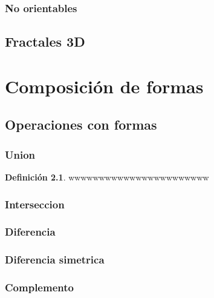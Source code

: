 \documentclass[
  16pt,
]{krantz}
\theoremstyle{definition}
\newtheorem{definition}{Definición}[chapter]
\theoremstyle{definition}
\theoremstyle{definition}
\theoremstyle{definition}
\theoremstyle{remark}
\begin{document}
\hypertarget{no-orientables}{%
\subsection{No orientables}\label{no-orientables}}

\hypertarget{fractales-3d}{%
\section{Fractales 3D}\label{fractales-3d}}

\hypertarget{composiciuxf3n-de-formas}{%
\chapter{Composición de formas}\label{composiciuxf3n-de-formas}}

\hypertarget{operaciones-con-formas}{%
\section{Operaciones con formas}\label{operaciones-con-formas}}

\hypertarget{union}{%
\subsection{Union}\label{union}}

\begin{definition}
\protect\hypertarget{def:unnamed-chunk-1}{}{\label{def:unnamed-chunk-1} }wwwwwwwwwwwwwwwwwwwwwww
\end{definition}

\hypertarget{interseccion}{%
\subsection{Interseccion}\label{interseccion}}

\hypertarget{diferencia}{%
\subsection{Diferencia}\label{diferencia}}

\hypertarget{diferencia-simetrica}{%
\subsection{Diferencia simetrica}\label{diferencia-simetrica}}

\hypertarget{complemento}{%
\subsection{Complemento}\label{complemento}}
\end{document}

